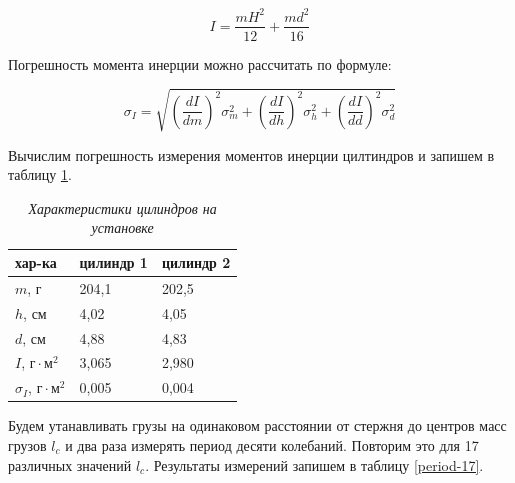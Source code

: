 \documentclass[a4paper,12pt]{article}
\begin{document}
\begin{equation}
    I = \frac{mH^2}{12} + \frac{md^2}{16}
\end{equation}

Погрешность момента инерции можно рассчитать по формуле:

\begin{equation}
    \sigma_I = \sqrt{
    \left( \frac{dI}{dm} \right)^2 \sigma_{m}^2 +
    \left( \frac{dI}{dh} \right)^2 \sigma_{h}^2 +
    \left( \frac{dI}{dd} \right)^2 \sigma_{d}^2
    }
\end{equation}

Вычислим погрешность измерения моментов инерции цилтиндров и запишем в таблицу \ref{cilinders}.

\begin{table}[!ht]
    \centering
    \begin{tabular}{|l|l|l|}
    \hline
        \textbf{хар-ка} & \textbf{цилиндр 1} & \textbf{цилиндр 2} \\ \hline
        $m$, г & 204,1 & 202,5 \\ \hline
        $h$, см & 4,02 & 4,05 \\ \hline
        $d$, см & 4,88 & 4,83 \\ \hline
        $I$, $\text{г} \cdot \text{м}^2$ & 3,065 & 2,980 \\ \hline
        $\sigma_I$, $\text{г} \cdot \text{м}^2$ & 0,005 & 0,004 \\ \hline
    \end{tabular}\caption{\textit{Характеристики цилиндров на установке}}\label{cilinders}
\end{table}



Будем утанавливать грузы на одинаковом расстоянии от стержня до центров масс грузов $l_c$ и два раза измерять период десяти колебаний. Повторим это для 17 различных значений $l_c$. Результаты измерений запишем в таблицу \ref{period-17}.
\end{document}

